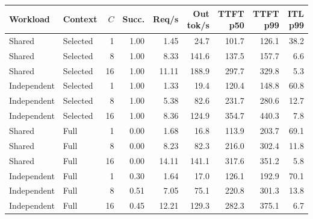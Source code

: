 \begin{tabular}{llrrrrrrr}
\toprule
Workload & Context & $C$ & Succ. & Req/s & Out tok/s & TTFT p50 & TTFT p99 & ITL p99 \\
\midrule
Shared & Selected & 1 & 1.00 & 1.45 & 24.7 & 101.7 & 126.1 & 38.2 \\
Shared & Selected & 8 & 1.00 & 8.33 & 141.6 & 137.5 & 157.7 & 6.6 \\
Shared & Selected & 16 & 1.00 & 11.11 & 188.9 & 297.7 & 329.8 & 5.3 \\
Independent & Selected & 1 & 1.00 & 1.33 & 19.4 & 120.4 & 148.8 & 60.8 \\
Independent & Selected & 8 & 1.00 & 5.38 & 82.6 & 231.7 & 280.6 & 12.7 \\
Independent & Selected & 16 & 1.00 & 8.36 & 124.9 & 354.7 & 440.3 & 7.8 \\
Shared & Full & 1 & 0.00 & 1.68 & 16.8 & 113.9 & 203.7 & 69.1 \\
Shared & Full & 8 & 0.00 & 8.23 & 82.3 & 216.0 & 302.4 & 11.8 \\
Shared & Full & 16 & 0.00 & 14.11 & 141.1 & 317.6 & 351.2 & 5.8 \\
Independent & Full & 1 & 0.30 & 1.64 & 17.0 & 126.1 & 192.9 & 70.1 \\
Independent & Full & 8 & 0.51 & 7.05 & 75.1 & 220.8 & 301.3 & 13.8 \\
Independent & Full & 16 & 0.45 & 12.21 & 129.3 & 282.3 & 375.1 & 6.7 \\
\bottomrule
\end{tabular}

